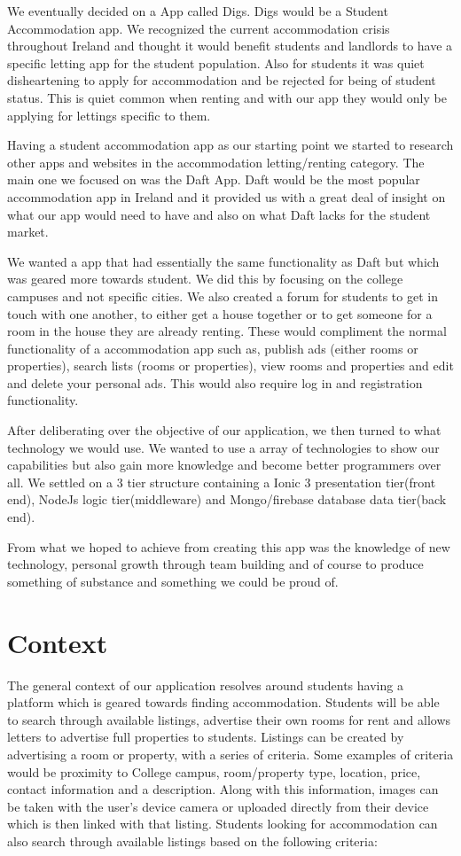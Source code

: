 We eventually decided on a App called Digs. Digs would be a Student Accommodation app. We recognized the current accommodation crisis throughout Ireland and thought it would benefit students and landlords to have a specific letting app for the student population. Also for students it was quiet disheartening to apply for accommodation and be rejected for being of student status. This is quiet common when renting and with our app they would only be applying for lettings specific to them.

Having a student accommodation app as our starting point we started to research other apps and websites in the accommodation letting/renting category. The main one we focused on was the Daft App\cite{Daft}. Daft would be the most popular accommodation app in Ireland and it provided us with a great deal of insight on what our app would need to have and also on what Daft lacks for the student market. 

We wanted a app that had essentially the same functionality as Daft but which was geared more towards student. We did this by focusing on the college campuses and not specific cities. We also created a forum for students to get in touch with one another, to either get a house together or to get someone for a room in the house they are already renting. These would compliment the normal functionality of a accommodation app such as, publish ads (either rooms or properties), search lists (rooms or properties), view rooms and properties and edit and delete your personal ads. This would also require log in and registration functionality.

After deliberating over the objective of our application, we then turned to what technology we would use. We wanted to use a array of technologies to show our capabilities but also gain more knowledge and become better programmers over all. We settled on a 3 tier structure containing a Ionic 3 presentation tier(front end), NodeJs logic tier(middleware)  and Mongo/firebase database data tier(back end).

From what we hoped to achieve from creating this app was the knowledge of new technology, personal growth through team building and of course to produce something of substance and something we could be proud of.

\chapter{Context}
The general context of our application resolves around students having a platform which is geared towards finding accommodation. Students will be able to search through available listings, advertise their own rooms for rent and allows letters to advertise full properties to students. Listings can be created by advertising a room or property, with a series of criteria. Some examples of criteria would be proximity to College campus, room/property type, location, price, contact information and a description. Along with this information, images can be taken with the user’s device camera or uploaded directly from their device which is then linked with that listing. Students looking for accommodation can also search through available listings based on the following criteria: 

